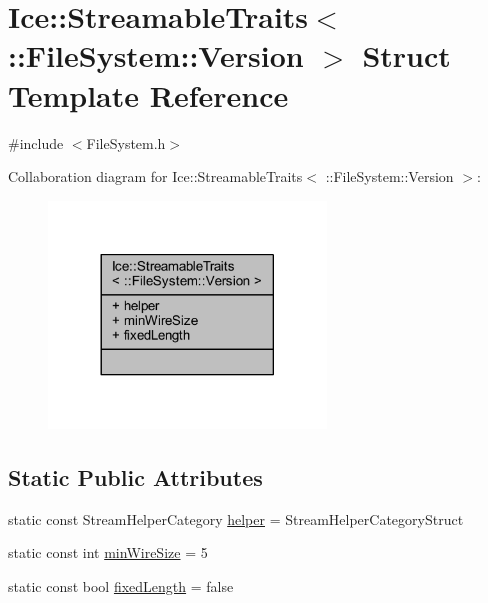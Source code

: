 \hypertarget{struct_ice_1_1_streamable_traits_3_01_1_1_file_system_1_1_version_01_4}{}\section{Ice\+:\+:Streamable\+Traits$<$ \+:\+:File\+System\+:\+:Version $>$ Struct Template Reference}
\label{struct_ice_1_1_streamable_traits_3_01_1_1_file_system_1_1_version_01_4}


{\ttfamily \#include $<$File\+System.\+h$>$}



Collaboration diagram for Ice\+:\+:Streamable\+Traits$<$ \+:\+:File\+System\+:\+:Version $>$\+:
\nopagebreak
\begin{figure}[H]
\begin{center}
\leavevmode
\includegraphics[width=209pt]{struct_ice_1_1_streamable_traits_3_01_1_1_file_system_1_1_version_01_4__coll__graph}
\end{center}
\end{figure}
\subsection*{Static Public Attributes}
\begin{DoxyCompactItemize}
\item 
static const Stream\+Helper\+Category \hyperlink{struct_ice_1_1_streamable_traits_3_01_1_1_file_system_1_1_version_01_4_add349dd746a44c2f0b7828e02bcbbb87}{helper} = Stream\+Helper\+Category\+Struct
\item 
static const int \hyperlink{struct_ice_1_1_streamable_traits_3_01_1_1_file_system_1_1_version_01_4_ade824a15ad09894f99e4e26e4ea59d12}{min\+Wire\+Size} = 5
\item 
static const bool \hyperlink{struct_ice_1_1_streamable_traits_3_01_1_1_file_system_1_1_version_01_4_a2aa04e83f01df92e2d2271004f71f744}{fixed\+Length} = false
\end{DoxyCompactItemize}


